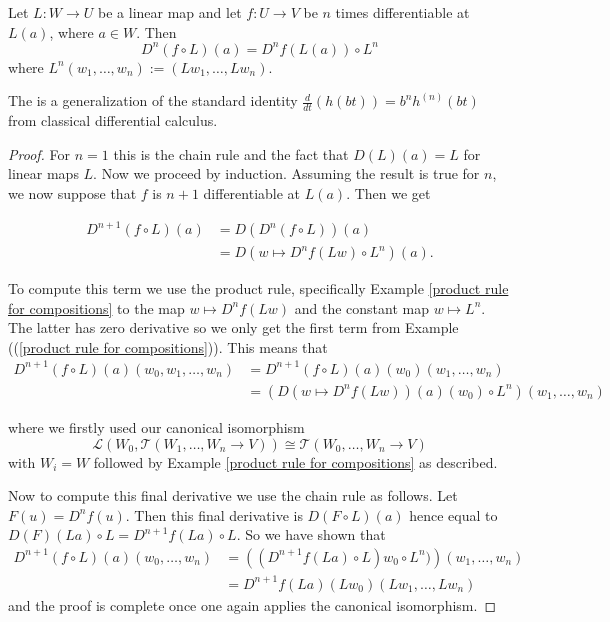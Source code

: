 \documentclass[twoside, a4paper, 10pt]{amsart}
\begin{document}
\begin{lemma}\label{lemma: iterated linear chain rule}  Let $L: W \to U$ be a linear map and let $f:U \to V$ be $n$ times differentiable at $L(a)$, where $a \in W$. Then $$D^n(f \circ L)(a) = D^nf (L(a)) \circ  L^n$$ where $L^n(w_1, \ldots, w_n) := (Lw_1, \ldots, Lw_n)$. \end{lemma}

\begin{remark} The is a generalization of the standard identity $\frac{d}{dt}(h(b t)) = b^n h^{(n)}(b t)$ from classical differential calculus. \end{remark}

\begin{proof} For $n=1$ this is the chain rule and the fact that $D(L)(a)=L$ for linear maps $L$. Now we proceed by induction. Assuming the result is true for $n$, we now suppose that $f$ is $n+1$ differentiable at $L(a)$. Then we get

\begin{align*} D^{n+1}(f \circ L)(a)  &= D(D^n(f \circ L))(a) \\ &= D( w \mapsto D^n f(Lw)  \circ L^n)(a). \end{align*} 

To compute this term we use the product rule, specifically Example \ref{product rule for compositions} to the map $w \mapsto D^nf(Lw)$ and the constant map $w \mapsto L^n$. The latter has zero derivative so we only get the first term from Example ((\ref{product rule for compositions})). This means that \begin{align*} D^{n+1}(f \circ L)(a) (w_0, w_1, \ldots, w_n) &= D^{n+1}(f \circ L)(a)(w_0) (w_1, \ldots, w_n) \\ &=( D( w \mapsto D^nf(Lw)) (a) (w_0) \circ L^n ) (w_1, \ldots, w_n) \end{align*}

where we firstly used our canonical isomorphism  $$\mathcal{L}(W_0, \mathcal{T}(W_1, \ldots, W_n \to V)) \cong \mathcal{T}(W_0, \ldots, W_n \to V)$$ with $W_i = W$ followed by Example \ref{product rule for compositions} as described.

 Now to compute this final derivative we use the chain rule as follows. Let $F(u) = D^nf(u)$. Then this final derivative is $D(F \circ L) (a)$ hence equal to $D(F)(La) \circ L= D^{n+1}f(La) \circ L$. So we have shown that \begin{align*} D^{n+1}(f \circ L)(a)(w_0, \ldots, w_n) &= \left((D^{n+1}f(La) \circ L)w_0 \circ L^n) \right) (w_1, \ldots, w_n) \\ &= D^{n+1}f(La) (Lw_0) (Lw_1, \ldots, Lw_n) \end{align*} and the proof is complete once one again applies the canonical isomorphism.
\end{proof}
\end{document}
